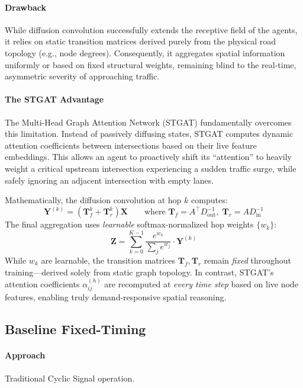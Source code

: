 \documentclass[12pt, onecolumn]{IEEEtran}
\begin{document}
\paragraph{Drawback} While diffusion convolution successfully extends the receptive field of the agents, it relies on static transition matrices derived purely from the physical road topology (e.g., node degrees). Consequently, it aggregates spatial information uniformly or based on fixed structural weights, remaining blind to the real-time, asymmetric severity of approaching traffic. \\
\paragraph{The STGAT Advantage} The Multi-Head Graph Attention Network (STGAT) fundamentally overcomes this limitation. Instead of passively diffusing states, STGAT computes dynamic attention coefficients between intersections based on their live feature embeddings. This allows an agent to proactively shift its ``attention'' to heavily weight a critical upstream intersection experiencing a sudden traffic surge, while safely ignoring an adjacent intersection with empty lanes.

Mathematically, the diffusion convolution at hop $k$ computes:
\begin{equation}
    \mathbf{Y}^{(k)} = (\mathbf{T}_f^k + \mathbf{T}_r^k) \mathbf{X} \qquad \text{where } \mathbf{T}_f = A^\top D_{\text{out}}^{-1}, \; \mathbf{T}_r = A D_{\text{in}}^{-1}
\end{equation}
The final aggregation uses \textit{learnable} softmax-normalized hop weights $\{w_k\}$:
\begin{equation}
    \mathbf{Z} = \sum_{k=0}^{K-1} \frac{e^{w_k}}{\sum_{j} e^{w_j}} \cdot \mathbf{Y}^{(k)}
\end{equation}
While $w_k$ are learnable, the transition matrices $\mathbf{T}_f, \mathbf{T}_r$ remain \textit{fixed} throughout training---derived solely from static graph topology. In contrast, STGAT's attention coefficients $\alpha_{ij}^{(h)}$ are recomputed at \textit{every time step} based on live node features, enabling truly demand-responsive spatial reasoning.

\subsection{Baseline Fixed-Timing}
\paragraph{Approach} Traditional Cyclic Signal operation. \\
\end{document}
